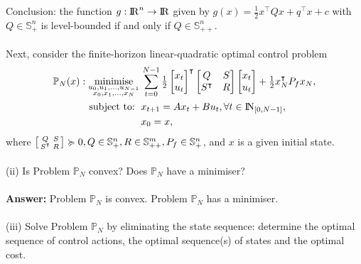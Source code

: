 \documentclass[a4paper,11pt,reqno]{amsart}
\newcommand{\R}{{\rm I\!R}}
\newcommand{\N}{{\rm I\!N}}
\newcommand{\tran}{\intercal}
\DeclareMathOperator*{\minimise}{minimise}
\begin{document}
Conclusion: the function $g:\R^n\to \R$ given by $g(x) = \frac{1}{2}x^{\tran}Qx+q^{\tran}x+c$ with $Q\in \mathbb{S}^n_+$ is level-bounded
if and only if $Q\in \mathbb{S}^n_{++}$.
\\ \\
Next, consider the finite-horizon linear-quadratic optimal control problem
\begin{subequations}
    \begin{align}
        \mathbb{P}_N(x): \minimise_{\substack{u_0,u_1,\ldots,u_{N-1}\\ x_0,x_1,\ldots,x_N}} \,
         & \sum_{t=0}^{N-1}\textstyle\frac{1}{2}
         \begin{bmatrix}
             x_t\\
             u_t
         \end{bmatrix}^{\tran}
         \begin{bmatrix}
             Q&S\\
             S^{\tran}&R
         \end{bmatrix}
         \begin{bmatrix}
             x_t\\
             u_t
         \end{bmatrix}
         +\frac{1}{2}x_N^{\tran}P_fx_N,
        \\
        \text{subject to: }\,
         & x_{t+1} = A x_t + B u_t, \forall t\in\N_{[0, N-1]},
        \\
         & x_{0} = x,
    \end{align}
\end{subequations}
where $\begin{bsmallmatrix}Q&S\\S^{\tran}&R\end{bsmallmatrix}\succcurlyeq 0, Q\in \mathbb{S}^n_+, R\in \mathbb{S}^m_{++}, P_f\in \mathbb{S}^n_{+}$, and $x$ is a given initial state.
\\ \\
(ii) Is Problem $\mathbb{P}_N$ convex? Does $\mathbb{P}_N$ have a minimiser?
\\ \\
\textbf{Answer:} Problem $\mathbb{P}_N$ is convex. Problem $\mathbb{P}_N$ has a minimiser.
\\ \\
(iii) Solve Problem $\mathbb{P}_N$ by eliminating the state sequence: determine the optimal sequence of control actions, the optimal sequence(s) of states and the optimal cost.
\\ \\
\end{document}
